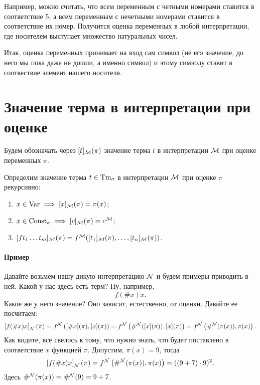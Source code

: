Например, можно считать, что всем переменным с четными номерами ставится в соответствие 5, а всем переменным с нечетными номерами ставится в соответствие их номер.
Получится оценка переменных в любой интерпретации, где носителем выступает множество натуральных чисел.

Итак, оценка переменных принимает на вход сам символ (не его значение, до него мы пока даже не дошли, а именно символ) и этому символу ставит в соотвествие элемент нашего носителя.

\section{Значение терма в интерпретации при оценке}

\begin{notation*}
    Будем обозначать через $[t]_{\mathcal{M}}(\pi)$ значение терма $t$ в интерпретации $\mathcal{M}$ при оценке переменных $\pi$.
\end{notation*}

\begin{definition}
    Определим значение терма $t \in \mathrm{Tm}_{\sigma}$ в интерпретации $\mathcal{M}$ при оценке $\pi$ рекурсивно:
    \begin{enumerate}
        \item $x \in \mathrm{Var} \implies [x]_{\mathcal{M}}(\pi) = \pi(x)$;
        \item $x \in \mathrm{Const}_{\sigma} \implies [c]_{\mathcal{M}}(\pi) = c^{\mathcal{M}}$;
        \item $[f t_{1} \ldots t_{m}]_{\mathcal{M}}(\pi) = f^{\mathcal{M}}([t_{1}]_{\mathcal{M}}(\pi), \ldots, [t_{n}]_{\mathcal{M}}(\pi))$.
    \end{enumerate}
\end{definition}

\paragraph{Пример}
Давайте возьмем нашу дикую интерпретацию $\mathcal{N}$ и будем примеры приводить в ней.
Какой у нас здесь есть терм?
Ну, например,
$$
    f(\# x)x.
$$
Какое же у него значение?
Оно зависит, естественно, от оценки.
Давайте ее посчитаем:
$$
    \left[ f(\# x)x \right]_{\mathcal{N}}(\pi) = f^{\mathcal{N}}\left( [\# x](\pi), [x](\pi) \right) = f^{\mathcal{N}}\left( \#^{\mathcal{N}}([x](\pi)), [x](\pi) \right) = f^{\mathcal{N}}\left( \#^{\mathcal{N}}(\pi(x)), \pi(x) \right).
$$
Как видите, все свелось к тому, что нужно знать, что будет поставлено в соответствие $x$ функцией $\pi$.
Допустим, $\pi(x) = 9$, тогда
$$
    \left[ f(\# x)x \right]_{\mathcal{N}}(\pi) = f^{\mathcal{N}}\left( \#^{\mathcal{N}}(\pi(x)), \pi(x) \right) = ((9 + 7) \cdot 9)^{2}.
$$
Здесь $\#^{\mathcal{N}}(\pi(x)) = \#^{\mathcal{N}}(9) = 9 + 7$.

